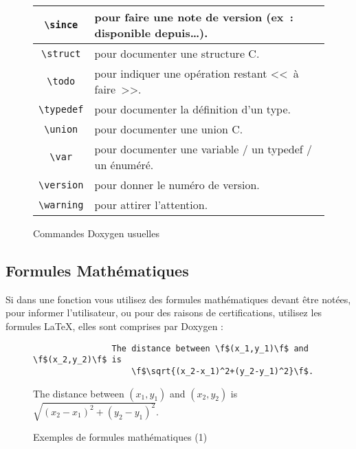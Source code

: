 \begin{figure}[H]
\begin{changemargin}{-2.5cm}{-2.5cm}
\begin{tabular}{@{\extracolsep{\fill}} | c || l | }
				\verb+\since+ & pour faire une note de version (ex : disponible depuis\dots). \\ \hline
				\verb+\struct+ & pour documenter une structure C. \\ \hline
				\verb+\todo+ & pour indiquer une opération restant << à faire >>. \\ \hline
				\verb+\typedef+ & pour documenter la définition d'un type. \\ \hline
				\verb+\union+ & pour documenter une union C. \\ \hline
				\verb+\var+ & pour documenter une variable / un typedef / un énuméré. \\ \hline
				\verb+\version+ & pour donner le numéro de version. \\ \hline
				\verb+\warning+ & pour attirer l'attention. \\ \hline
			\end{tabular}
			\end{changemargin}
			\caption{Commandes Doxygen usuelles}
		\end{figure}

	\subsection{Formules Mathématiques}
		Si dans une fonction vous utilisez des formules mathématiques devant être notées, pour informer l'utilisateur, ou pour des raisons de certifications, utilisez les formules \LaTeX, elles sont comprises par Doxygen :

		\begin{figure}[H]
			\begin{changemargin}{-2.5cm}{-2.5cm}
			\begin{tcolorbox}
			\begin{verbatim}
				The distance between \f$(x_1,y_1)\f$ and \f$(x_2,y_2)\f$ is 
				    \f$\sqrt{(x_2-x_1)^2+(y_2-y_1)^2}\f$.
			\end{verbatim}
			\end{tcolorbox}
			\end{changemargin}

			\begin{changemargin}{-2.5cm}{-2.5cm}
			\begin{tcolorbox}
				The distance between $(x_1,y_1)$ and $(x_2,y_2)$ is $\sqrt{(x_2-x_1)^2+(y_2-y_1)^2}$.
			\end{tcolorbox}
			\end{changemargin}
			\caption{Exemples de formules mathématiques (1)}
		\end{figure}


